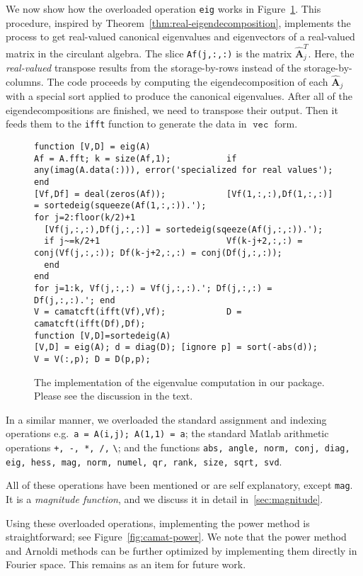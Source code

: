 \documentclass[1p,authoryear,letterpaper]{elsarticle}
\DeclareMathOperator{\tvec}{\texttt{vec}}
\providecommand{\mat}{\boldsymbol}
\providecommand{\mhat}[1]{\ensuremath{\mat{\hat{#1}}}}
\providecommand{\mAhat}{\mhat{A}}
\begin{document}
We now show how the overloaded operation \texttt{eig} works
in Figure~\ref{fig:camat-eig}.  This procedure, inspired
by Theorem~\ref{thm:real-eigendecomposition}, implements
the process to get real-valued canonical eigenvalues
and eigenvectors of a real-valued matrix in
the circulant algebra. The slice \verb#Af(j,:,:)#
is the matrix $\mAhat_j^T$.  Here, the \emph{real-valued}
transpose results from
the storage-by-rows instead of the storage-by-columns.
The code proceeds by computing the eigendecomposition of each
$\mAhat_j$ with a special sort applied to produce the canonical
eigenvalues.  After all of the eigendecompositions are finished,
we need to transpose their output.  Then it feeds them to
the \texttt{ifft} function to generate the data in $\tvec$
form.

\begin{figure}
\begin{verbatim}
function [V,D] = eig(A)
Af = A.fft; k = size(Af,1);           if any(imag(A.data(:))), error('specialized for real values'); end
[Vf,Df] = deal(zeros(Af));            [Vf(1,:,:),Df(1,:,:)] = sortedeig(squeeze(Af(1,:,:)).');
for j=2:floor(k/2)+1
  [Vf(j,:,:),Df(j,:,:)] = sortedeig(sqeeze(Af(j,:,:)).');
  if j~=k/2+1                         Vf(k-j+2,:,:) = conj(Vf(j,:,:)); Df(k-j+2,:,:) = conj(Df(j,:,:));
  end
end
for j=1:k, Vf(j,:,:) = Vf(j,:,:).'; Df(j,:,:) = Df(j,:,:).'; end
V = camatcft(ifft(Vf),Vf);            D = camatcft(ifft(Df),Df);
function [V,D]=sortedeig(A)
[V,D] = eig(A); d = diag(D); [ignore p] = sort(-abs(d));
V = V(:,p); D = D(p,p);               \end{verbatim}
\caption{The implementation of the eigenvalue computation
in our package.  Please see the discussion in the text.}
\label{fig:camat-eig}
\end{figure}

In a similar manner, we overloaded the standard assignment
and indexing operations e.g.\ \texttt{a = A(i,j); A(1,1) = a};
the standard Matlab arithmetic operations \texttt{+, -, *, /,}
\verb#\#;
and the functions \texttt{abs, angle, norm, conj, diag, eig,
hess, mag, norm, numel, qr, rank, size, sqrt, svd}.

All of these operations have been mentioned or are self explanatory, 
except \texttt{mag}. It  is a {\em magnitude
function}, and we discuss it in detail in~\ref{sec:magnitude}.

Using these overloaded operations, implementing the power method
is straightforward; see Figure~\ref{fig:camat-power}. 
We note that the power method and Arnoldi methods can be further optimized 
by implementing them directly in Fourier space. This remains as an item for future work.
\end{document}
